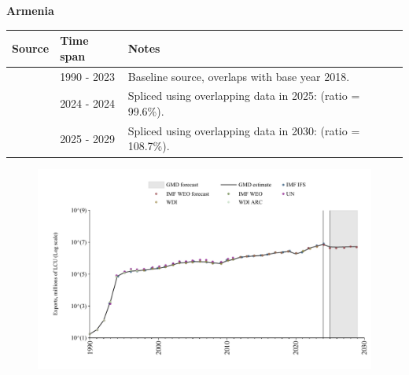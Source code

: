\documentclass[12pt,a4paper,landscape]{article}
\begin{document}
\begin{adjustbox}{max totalsize={\paperwidth}{\paperheight},center}
\begin{minipage}[t][\textheight][t]{\textwidth}
\vspace*{0.5cm}
{}
\begin{center}
{\Large\bfseries Armenia}
\end{center}
\vspace{0.5cm}
\begin{table}[H]
\centering
\small
\begin{tabular}{|l|l|l|}
\hline
\textbf{Source} & \textbf{Time span} & \textbf{Notes} \\
\hline
\rowcolor{white}\cite{WDI}& 1990 - 2023 &Baseline source, overlaps with base year 2018.\\
\rowcolor{lightgray}\cite{IMF_IFS}& 2024 - 2024 &Spliced using overlapping data in 2025: (ratio = 99.6\%).\\
\rowcolor{white}\cite{IMF_WEO_forecast}& 2025 - 2029 &Spliced using overlapping data in 2030: (ratio = 108.7\%).\\
\hline
\end{tabular}
\end{table}
\begin{figure}[H]
\centering
\includegraphics[width=\textwidth,height=0.6\textheight,keepaspectratio]{graphs/ARM_exports.pdf}
\end{figure}
\end{minipage}
\end{adjustbox}
\end{document}
